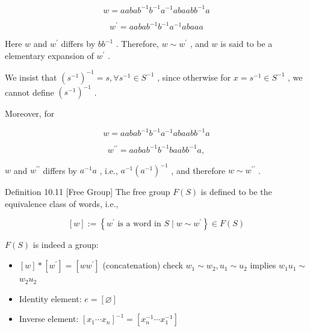 \[
w = {aaba}{b}^{-1}{b}^{-1}{a}^{-1}{abaab}{b}^{-1}a
\]

\[
{w}^{\prime } = {aaba}{b}^{-1}{b}^{-1}{a}^{-1}{abaaa}
\]

Here \(w\) and \({w}^{\prime }\) differs by \(b{b}^{-1}\) . Therefore, \(w \sim  {w}^{\prime }\) , and \(w\) is said to be a elementary expansion of \({w}^{\prime }\) .

We insist that \({\left( {s}^{-1}\right) }^{-1} = s,\forall {s}^{-1} \in  {S}^{-1}\) , since otherwise for \(x = {s}^{-1} \in  {S}^{-1}\) , we cannot define \({\left( {s}^{-1}\right) }^{-1}\) .

Moreover, for

\[
w = {aaba}{b}^{-1}{b}^{-1}{a}^{-1}{abaab}{b}^{-1}a
\]

\[
{w}^{\prime \prime } = {aaba}{b}^{-1}{b}^{-1}{baab}{b}^{-1}a,
\]

\(w\) and \({w}^{\prime \prime }\) differs by \({a}^{-1}a\) , i.e., \({a}^{-1}{\left( {a}^{-1}\right) }^{-1}\) , and therefore \(w \sim  {w}^{\prime \prime }\) .

Definition 10.11 [Free Group] The free group \(F\left( S\right)\) is defined to be the equivalence class of words, i.e.,

\[
\left\lbrack  w\right\rbrack   \mathrel{\text{ := }} \left\{  {{w}^{\prime }\text{ is a word in }S \mid  w \sim  {w}^{\prime }}\right\}   \in  F\left( S\right)
\]

\(F\left( S\right)\) is indeed a group:

\begin{itemize}
\item \(\left\lbrack  w\right\rbrack   * \left\lbrack  {w}^{\prime }\right\rbrack   = \left\lbrack  {w{w}^{\prime }}\right\rbrack\) (concatenation) check \({w}_{1} \sim  {w}_{2},{u}_{1} \sim  {u}_{2}\) implies \({w}_{1}{u}_{1} \sim\)  \({w}_{2}{u}_{2}\)
\end{itemize}

\begin{itemize}
\item Identity element: \(e = \left\lbrack  \varnothing \right\rbrack\)
\end{itemize}

\begin{itemize}
\item Inverse element: \({\left\lbrack  {x}_{1}\cdots {x}_{n}\right\rbrack  }^{-1} = \left\lbrack  {{x}_{n}^{-1}\cdots {x}_{1}^{-1}}\right\rbrack\)
\end{itemize}


